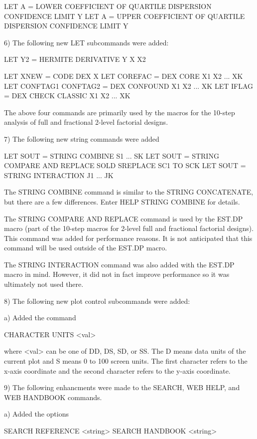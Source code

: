        LET A = LOWER COEFFICIENT OF QUARTILE DISPERSION CONFIDENCE LIMIT Y
       LET A = UPPER COEFFICIENT OF QUARTILE DISPERSION CONFIDENCE LIMIT Y

 6) The following new LET subcommands were added:

       LET Y2 = HERMITE DERIVATIVE Y X X2

       LET XNEW = CODE DEX X
       LET COREFAC = DEX CORE X1 X2 ... XK
       LET CONFTAG1 CONFTAG2 = DEX CONFOUND X1 X2 ... XK
       LET IFLAG = DEX CHECK CLASSIC X1 X2 ... XK

    The above four commands are primarily used by the macros for the
    10-step analysis of full and fractional 2-level factorial designs.

 7) The following new string commands were added

       LET SOUT = STRING COMBINE S1 ... SK
       LET SOUT = STRING COMPARE AND REPLACE SOLD SREPLACE SC1 TO SCK
       LET SOUT = STRING INTERACTION J1 ... JK

    The STRING COMBINE command is similar to the STRING CONCATENATE, but
    there are a few differences.  Enter HELP STRING COMBINE for details.

    The STRING COMPARE AND REPLACE command is used by the EST.DP macro
    (part of the 10-step macros for 2-level full and fractional factorial
    designs).  This command was added for performance reasons.  It is not
    anticipated that this command will be used outside of the EST.DP macro.

    The STRING INTERACTION command was also added with the EST.DP macro
    in mind.  However, it did not in fact improve performance so it was
    ultimately not used there.

 8) The following new plot control subcommands were added:

    a) Added the command

         CHARACTER UNITS <val> 

       where <val> can be one of DD, DS, SD, or SS.  The D means data
       units of the current plot and S means 0 to 100 screen units.
       The first character refers to the x-axis coordinate and the
       second character refers to the y-axis coordinate.

 9) The following enhancments were made to the SEARCH, WEB HELP,
    and WEB HANDBOOK commands.

    a) Added the options

         SEARCH REFERENCE <string>
         SEARCH HANDBOOK  <string>

